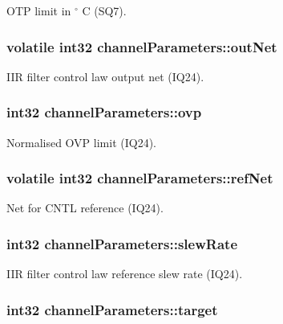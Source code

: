 O\-T\-P limit in $ ^\circ$ C (S\-Q7). \hypertarget{structchannel_parameters_ae9a6e93b8f7d8554dd06269339167215}{
\subsubsection[{out\-Net}]{\setlength{\rightskip}{0pt plus 5cm}volatile int32 channel\-Parameters\-::out\-Net}}\label{structchannel_parameters_ae9a6e93b8f7d8554dd06269339167215}
I\-I\-R filter control law output net (I\-Q24). \hypertarget{structchannel_parameters_aefb9a7e765e361d08e0ae0bbc352e244}{
\subsubsection[{ovp}]{\setlength{\rightskip}{0pt plus 5cm}int32 channel\-Parameters\-::ovp}}\label{structchannel_parameters_aefb9a7e765e361d08e0ae0bbc352e244}
Normalised O\-V\-P limit (I\-Q24). \hypertarget{structchannel_parameters_a8e3dbb10da7b72b7b4fe6c200fbb495c}{
\subsubsection[{ref\-Net}]{\setlength{\rightskip}{0pt plus 5cm}volatile int32 channel\-Parameters\-::ref\-Net}}\label{structchannel_parameters_a8e3dbb10da7b72b7b4fe6c200fbb495c}
Net for C\-N\-T\-L reference (I\-Q24). \hypertarget{structchannel_parameters_a09eb121ecb75a652f7689869d1685a30}{
\subsubsection[{slew\-Rate}]{\setlength{\rightskip}{0pt plus 5cm}int32 channel\-Parameters\-::slew\-Rate}}\label{structchannel_parameters_a09eb121ecb75a652f7689869d1685a30}
I\-I\-R filter control law reference slew rate (I\-Q24). \hypertarget{structchannel_parameters_a2d9b0f07810affea40c8502613b8984e}{
\subsubsection[{target}]{\setlength{\rightskip}{0pt plus 5cm}int32 channel\-Parameters\-::target}}\label{structchannel_parameters_a2d9b0f07810affea40c8502613b8984e}
